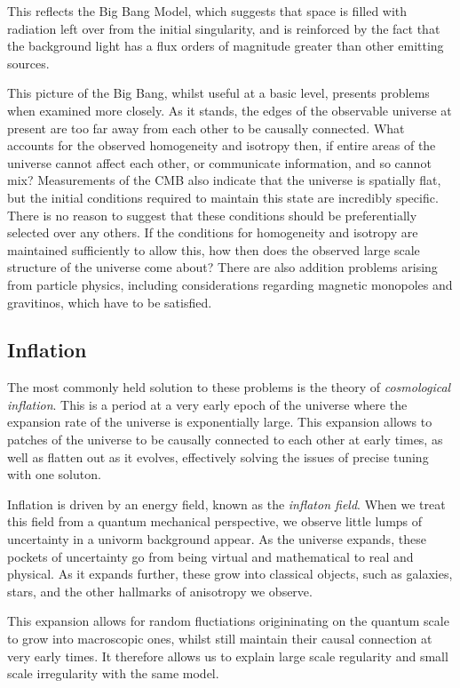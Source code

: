 This reflects the Big Bang Model, which suggests that space is filled with radiation left over from the initial singularity, and is reinforced by the fact that the background light has a flux orders of magnitude greater than other emitting sources.
\par This picture of the Big Bang, whilst useful at a basic level, presents problems when examined more closely. As it stands, the edges of the observable universe at present are too far away from each other to be causally connected. What accounts for the observed homogeneity and isotropy then, if entire areas of the universe cannot affect each other, or communicate information, and so cannot mix? Measurements of the CMB also indicate that the universe is spatially flat, but the initial conditions required to maintain this state are incredibly specific. There is no reason to suggest that these conditions should be preferentially selected over any others. If the conditions for homogeneity and isotropy are maintained sufficiently to allow this, how then does the observed large scale structure of the universe come about? There are also addition problems arising from particle physics, including considerations regarding magnetic monopoles and gravitinos, which have to be satisfied.

\subsection{Inflation}
The most commonly held solution to these problems is the theory of \emph{cosmological inflation}\cite{Linde:07}. This is a period at a very early epoch of the universe where the expansion rate of the universe is exponentially large. This expansion allows to patches of the universe to be causally connected to each other at early times, as well as flatten out as it evolves, effectively solving the issues of precise tuning with one soluton.

Inflation is driven by an energy field, known as the \emph{inflaton field}. When we treat this field from a quantum mechanical perspective, we observe little lumps of uncertainty in a univorm background appear. As the universe expands, these pockets of uncertainty go from being virtual and mathematical to real and physical. As it expands further, these grow into classical objects, such as galaxies, stars, and the other hallmarks of anisotropy we observe. 

This expansion allows for random fluctiations origininating on the quantum scale to grow into macroscopic ones, whilst still maintain their causal connection at very early times. It therefore allows us to explain large scale regularity and small scale irregularity with the same model. 

